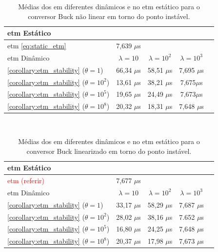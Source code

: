 \begin{table}[H]
  \centering
  \setlength{\tabcolsep}{10pt}
  \captionsetup{justification=centering}
  \begin{tabular}{lcccc}
    \toprule
      \acrshort{etm} Estático \\
    \midrule
    \acrshort{etm} \eqref{eq:static_etm} & 7,639 $\mu$s \\
    \bottomrule
    \toprule
    \acrshort{etm} Dinâmico & $\lambda = 10$ & $\lambda = 10^2$ & $\lambda = 10^3$ \\
    \midrule
      \autoref{corollary:etm_stability} ($\theta = 1$) & 66,34 $\mu$s & 58,51 $\mu$s & 7,695 $\mu$s   \\
      \autoref{corollary:etm_stability} ($\theta = 10^2$) & 13,61 $\mu$s & 38,21 $\mu$s & 7,675$\mu$s\\
      \autoref{corollary:etm_stability} ($\theta = 10^5$) & 19,65 $\mu$s & 24,49 $\mu$s & 7,673$\mu$s\\
      \autoref{corollary:etm_stability} ($\theta = 10^8$) & 20,32 $\mu$s & 18,31 $\mu$s & 7,648 $\mu$s\\
    \bottomrule
  \end{tabular} \\[4pt]
  \caption{Médias dos  em diferentes  dinâmicos e no \acrshort{etm} estático \newline para o conversor Buck não linear em torno do ponto instável.}
  \label{table:dynamic_etm_approaches_buck_sl}
\end{table}

\begin{table}[H]
  \centering
  \setlength{\tabcolsep}{10pt}
  \captionsetup{justification=centering}
  \begin{tabular}{lcccc}
    \toprule
      \acrshort{etm} Estático \\
    \midrule
    \textcolor{red}{  \acrshort{etm} (referir)} & 7,677 $\mu$s \\
    \bottomrule
    \toprule
      \acrshort{etm} Dinâmico & $\lambda = 10$ & $\lambda = 10^2$ & $\lambda = 10^3$ \\
    \midrule
      \autoref{corollary:etm_stability} ($\theta = 1$) & 33,17 $\mu$s & 58,29 $\mu$s & 7,687 $\mu$s \\
      \autoref{corollary:etm_stability} ($\theta = 10^2$) & 28,02 $\mu$s &  38,16 $\mu$s & 7.652  $\mu$s\\
      \autoref{corollary:etm_stability} ($\theta = 10^5$) & 16,80 $\mu$s & 24,25 $\mu$s & 7,648  $\mu$s\\
      \autoref{corollary:etm_stability} ($\theta = 10^8$) & 20,37 $\mu$s & 17,98 $\mu$s & 7,673  $\mu$s\\
    \bottomrule
  \end{tabular} \\[4pt]
  \caption{Médias dos  em diferentes  dinâmicos e no \acrshort{etm} estático \newline para o conversor Buck linearizado em torno do ponto instável.}
  \label{table:dynamic_etm_approaches_buck_snl}
\end{table}



